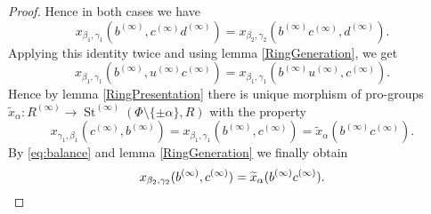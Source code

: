\documentclass{article}
\numberwithin{equation}{section}
\theoremstyle{definition}
\theoremstyle{remark}
\DeclareMathOperator\St{St}
\newcommand{\rA}{\mathsf{A}}
\begin{document}
\begin{proof}
 Hence in both cases we have
 \begin{equation}\label{eq:balance}
 x_{\beta_1, \gamma_1}(b^{(\infty)}, c^{(\infty)} d^{(\infty)}) = x_{\beta_2, \gamma_2}(b^{(\infty)} c^{(\infty)}, d^{(\infty)}).
 \end{equation}
 Applying this identity twice and using lemma \ref{RingGeneration}, we get
 \[x_{\beta_1, \gamma_1}(b^{(\infty)}, u^{(\infty)} c^{(\infty)}) = x_{\beta_1, \gamma_1}(b^{(\infty)} u^{(\infty)}, c^{(\infty)}).\]
 Hence by lemma \ref{RingPresentation} there is unique morphism of pro-groups \(\widetilde x_\alpha \colon R^{(\infty)} \to \St^{(\infty)}(\Phi \setminus \{\pm \alpha\}, R)\) with the property
 \[x_{\gamma_1, \beta_1}(c^{(\infty)}, b^{(\infty)}) = x_{\beta_1, \gamma_1}(b^{(\infty)}, c^{(\infty)}) = \widetilde x_\alpha(b^{(\infty)} c^{(\infty)}).\]
 By \eqref{eq:balance} and lemma \ref{RingGeneration} we finally obtain
 \[x_{\beta_2, \gamma_2}(b^{(\infty)}, c^{(\infty)}) = \widetilde x_\alpha(b^{(\infty)} c^{(\infty)}).\qedhere\]
 
 

\end{proof}
\end{document}

